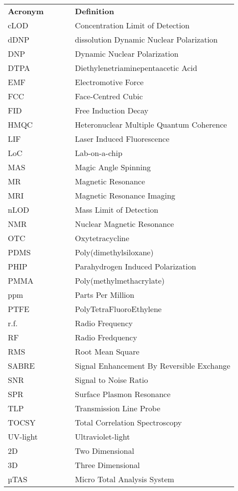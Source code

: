 \documentclass[oneside]{ecsthesis}      %
\begin{document}
\begin{table}[ht]
\begin{tabular}{lcccl}
\textbf{Acronym} & & & & \textbf{Definition}\\
cLOD & & & & Concentration Limit of Detection\\
dDNP & & & & dissolution Dynamic Nuclear Polarization\\
DNP & & & & Dynamic Nuclear Polarization\\
DTPA & & & & Diethylenetriaminepentaacetic Acid\\
EMF & & & & Electromotive Force\\
FCC & & & & Face-Centred Cubic\\
FID & & & & Free Induction Decay\\
HMQC & & & & Heteronuclear Multiple Quantum Coherence\\
LIF & & & & Laser Induced Fluorescence\\
LoC & & & & Lab-on-a-chip\\
MAS & & & & Magic Angle Spinning\\
MR & & & & Magnetic Resonance\\
MRI & & & & Magnetic Resonance Imaging\\
nLOD & & & & Mass Limit of Detection\\
NMR & & & & Nuclear Magnetic Resonance\\
OTC & & & & Oxytetracycline\\
PDMS & & & & Poly(dimethylsiloxane)\\
PHIP & & & & Parahydrogen Induced Polarization\\
PMMA & & & & Poly(methylmethacrylate)\\
ppm & & & & Parts Per Million\\
PTFE & & & & PolyTetraFluoroEthylene\\
r.f. & & & & Radio Frequency\\
RF & & & & Radio Fredquency\\
RMS & & & & Root Mean Square\\
SABRE & & & & Signal Enhancement By Reversible Exchange\\
SNR & & & & Signal to Noise Ratio\\
SPR & & & & Surface Plasmon Resonance\\
TLP & & & & Transmission Line Probe\\
TOCSY & & & & Total Correlation Spectroscopy\\
UV-light & & & & Ultraviolet-light\\
2D & & & & Two Dimensional\\
3D & & & & Three Dimensional\\
µTAS & & & & Micro Total Analysis System
\end{tabular}
\label{Abbreviations}
\end{table}
\end{document}
